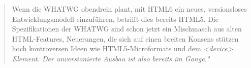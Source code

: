 \begin{quote}
	Wenn die WHATWG obendrein plant, mit HTML6 ein neues,
	versionsloses Entwicklungsmodell einzuführen, betrifft dies
	bereits HTML5. Die Spezifikationen der WHATWG sind schon
	jetzt ein Mischmasch aus alten HTML-Features, Neuerungen,
	die sich auf einen breiten Konsens stützen hoch kontroversen
	Ideen wie HTML5-Microformats und dem \em{<device>}
	Element. Der unversionierte Ausbau ist also bereits im Gange."
\end{quote}